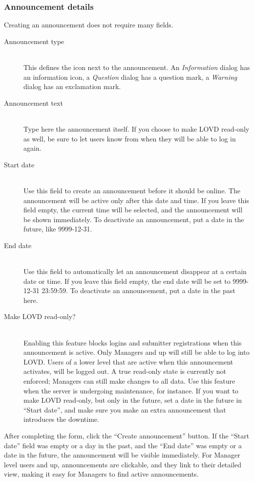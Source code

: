 \subsubsection{Announcement details}
Creating an announcement does not require many fields.
\begin{description}
  \item[Announcement type] \hfill \\
  This defines the icon next to the announcement. An \emph{Information} dialog has an information icon,
   a \emph{Question} dialog has a question mark, a \emph{Warning} dialog has an exclamation mark.
  \item[Announcement text] \hfill \\
  Type here the announcement itself.
  If you choose to make LOVD read-only as well, be sure to let users know from when they will be able to log in again.
  \item[Start date] \hfill \\
  Use this field to create an announcement before it should be online.
  The announcement will be active only after this date and time.
  If you leave this field empty, the current time will be selected, and the announcement will be shown immediately.
  To deactivate an announcement, put a date in the future, like 9999-12-31.
  \item[End date] \hfill \\
  Use this field to automatically let an announcement disappear at a certain date or time.
  If you leave this field empty, the end date will be set to 9999-12-31 23:59:59.
  To deactivate an announcement, put a date in the past here.
  \item[Make LOVD read-only?] \hfill \\
  Enabling this feature blocks logins and submitter registrations when this announcement is active.
  Only Managers and up will still be able to log into LOVD.
  Users of a lower level that are active when this announcement activates, will be logged out.
  A true read-only state is currently not enforced; Managers can still make changes to all data.
  Use this feature when the server is undergoing maintenance, for instance.
  If you want to make LOVD read-only, but only in the future, set a date in the future in ``Start date'',
   and make sure you make an extra announcement that introduces the downtime.
\end{description}

After completing the form, click the ``Create announcement'' button.
If the ``Start date'' field was empty or a day in the past, and the ``End date'' was empty or a date in the future,
 the announcement will be visible immediately.
For Manager level users and up, announcements are clickable, and they link to their detailed view,
 making it easy for Managers to find active announcements.



